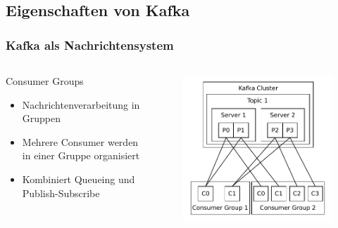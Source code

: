 \subsection{Eigenschaften von Kafka}
\begin{frame}
\frametitle{Kafka als Nachrichtensystem}
\centering
\begin{columns}[T] %
	\begin{column}[T]{.5\textwidth} 
		Consumer Groups
		\begin{itemize}
			\item Nachrichtenverarbeitung in Gruppen
			\item Mehrere Consumer werden in einer Gruppe organisiert
			\item Kombiniert Queueing und Publish-Subscribe
		\end{itemize}
	\end{column}
	\begin{column}[T]{.5\textwidth}
		\begin{figure}
		\centering
		\includegraphics[scale=0.7]{figure/consumer_groups.pdf}
		\end{figure}
	\end{column}
\end{columns}

\end{frame}

